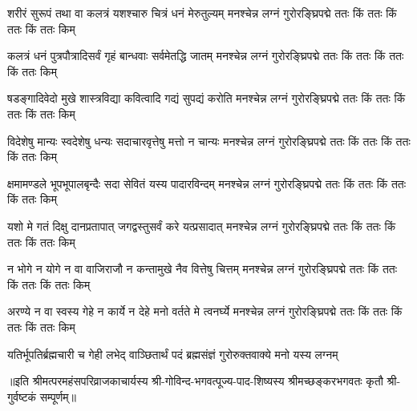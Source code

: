 

\fourlineindentedshloka
{शरीरं सुरूपं तथा वा कलत्रं}
{यशश्चारु चित्रं धनं मेरुतुल्यम्}
{मनश्चेन्न लग्नं गुरोरङ्घ्रिपद्मे}
{ततः किं ततः किं ततः किं ततः किम्}%


 \fourlineindentedshloka
{कलत्रं धनं पुत्रपौत्रादिसर्वं}
{गृहं बान्धवाः सर्वमेतद्धि जातम्}
{मनश्चेन्न लग्नं गुरोरङ्घ्रिपद्मे}
{ततः किं ततः किं ततः किं ततः किम्}%


\fourlineindentedshloka
{षडङ्गादिवेदो मुखे शास्त्रविद्या}
{कवित्वादि गद्यं सुपद्यं करोति}
{मनश्चेन्न लग्नं गुरोरङ्घ्रिपद्मे}
{ततः किं ततः किं ततः किं ततः किम्}%


\fourlineindentedshloka
{विदेशेषु मान्यः स्वदेशेषु धन्यः}
{सदाचारवृत्तेषु मत्तो न चान्यः}
{मनश्चेन्न लग्नं गुरोरङ्घ्रिपद्मे}
{ततः किं ततः किं ततः किं ततः किम्}%


\fourlineindentedshloka
{क्षमामण्डले भूपभूपालबृन्दैः}
{सदा सेवितं यस्य पादारविन्दम्}
{मनश्चेन्न लग्नं गुरोरङ्घ्रिपद्मे}
{ततः किं ततः किं ततः किं ततः किम्}%

\fourlineindentedshloka
{यशो मे गतं दिक्षु दानप्रतापात्}
{जगद्वस्तुसर्वं करे यत्प्रसादात्}
{मनश्चेन्न लग्नं गुरोरङ्घ्रिपद्मे}
{ततः किं ततः किं ततः किं ततः किम्}%

\fourlineindentedshloka
{न भोगे न योगे न वा वाजिराजौ}
{न कन्तामुखे नैव वित्तेषु चित्तम्}
{मनश्चेन्न लग्नं गुरोरङ्घ्रिपद्मे}
{ततः किं ततः किं ततः किं ततः किम्}%


\fourlineindentedshloka
{अरण्ये न वा स्वस्य गेहे न कार्ये}
{न देहे मनो वर्तते मे त्वनर्घ्ये}
{मनश्चेन्न लग्नं गुरोरङ्घ्रिपद्मे}
{ततः किं ततः किं ततः किं ततः किम्}%


{यतिर्भूपतिर्ब्रह्मचारी च गेही}
{लभेद् वाञ्छितार्थं पदं ब्रह्मसंज्ञं}
{गुरोरुक्तवाक्ये मनो यस्य लग्नम्}%


॥इति श्रीमत्परमहंसपरिव्राजकाचार्यस्य श्री-गोविन्द-भगवत्पूज्य-पाद-शिष्यस्य
श्रीमच्छङ्करभगवतः कृतौ श्री-गुर्वष्टकं सम्पूर्णम्॥